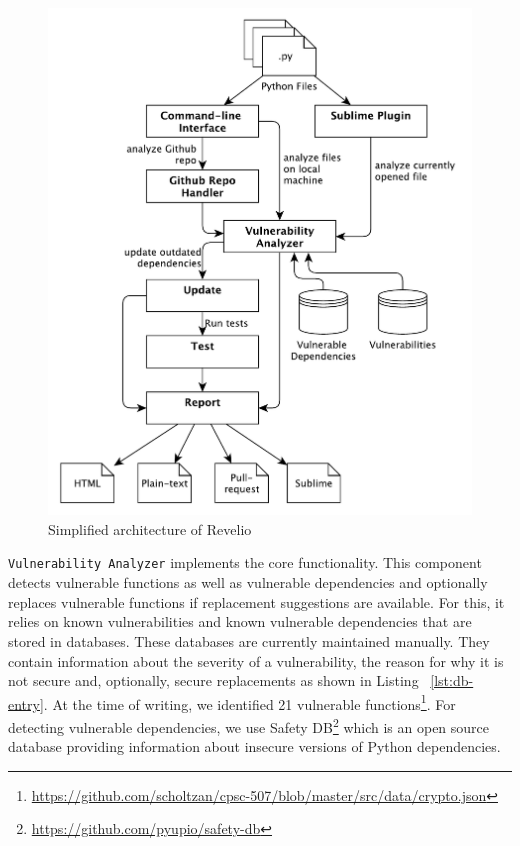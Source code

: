\begin{figure}[!h]
\centering
\includegraphics[width=\linewidth]{"figures/architecture"}
\caption{Simplified architecture of Revelio}
\label{fig:architecture}
\end{figure}


\texttt{Vulnerability Analyzer} implements the core functionality. This component detects vulnerable functions as well as vulnerable dependencies and optionally replaces vulnerable functions if replacement suggestions are available. For this, it relies on known vulnerabilities and known vulnerable dependencies that are stored in databases. These databases are currently maintained manually. They contain information about the severity of a vulnerability, the reason for why it is not secure and, optionally, secure replacements as shown in Listing ~\ref{lst:db-entry}. At the time of writing, we identified 21 vulnerable functions\footnote{\url{https://github.com/scholtzan/cpsc-507/blob/master/src/data/crypto.json}}. For detecting vulnerable dependencies, we use Safety DB\footnote{\url{https://github.com/pyupio/safety-db}} which is an open source database providing information about insecure versions of Python dependencies. 

